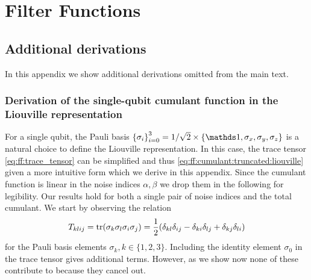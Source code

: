 \setchapterpreamble[u]{\margintoc}
\chapter{Filter Functions}\label{ch:app:ff}
\section{Additional derivations}\label{sec:app:ff:derivations:cumulant:pauli}
In this appendix we show additional derivations omitted from the main text.
\subsection{Derivation of the single-qubit cumulant function in the Liouville representation}
For a single qubit, the Pauli basis $\left\lbrace\sigma_i\right\rbrace_{i=0}^3 = 1/\sqrt{2}\times\left\lbrace\eye,\sx,\sy,\sz\right\rbrace$ is a natural choice to define the Liouville representation.
In this case, the trace tensor \cref{eq:ff:trace_tensor} can be simplified and thus \cref{eq:ff:cumulant:truncated:liouville} given a more intuitive form which we derive in this appendix.
Since the cumulant function is linear in the noise indices $\alpha,\beta$ we drop them in the following for legibility.
Our results hold for both a single pair of noise indices and the total cumulant.
We start by observing the relation
\begin{equation}\label{eq:ff:trace_tensor:four_paulis}
    T_{klij} = \tr(\sigma_k\sigma_l\sigma_i\sigma_j) = \frac{1}{2}(\delta_{kl}\delta_{ij} - \delta_{ki}\delta_{lj} + \delta_{kj}\delta_{li})
\end{equation}
for the Pauli basis elements $\sigma_k, k\in\lbrace 1, 2, 3\rbrace$.
Including the identity element $\sigma_0$ in the trace tensor gives additional terms.
However, as we show now none of these contribute to \cumulantfun because they cancel out.

